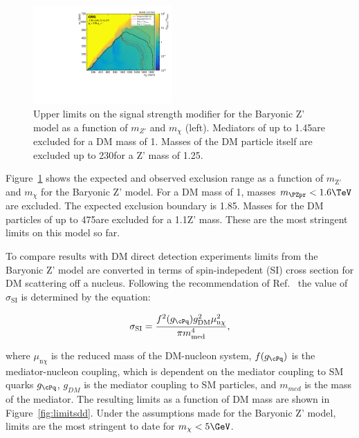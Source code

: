 \begin{figure}[htbp]
  \centering
  \includegraphics[width=0.475\textwidth]{figures/limits/limit2d_zpb_monohbb_.pdf}
  \caption{Upper limits on the signal strength modifier for the Baryonic Z' model  as a function of $m_{Z'}$ and $m_\chi$ (left). Mediators of up to 1.45\TeV are excluded for a DM mass of 1\GeV. Masses of the DM particle itself are excluded up to 230\GeV for a Z' mass of 1.25\TeV.}
  \label{fig:limits}
\end{figure}




Figure~\ref{fig:limits} shows the expected and observed exclusion range as a function of $m_{\text{Z}'}$ and $m_{\chi}$ for the Baryonic Z' model. For a DM mass of 1\GeV, masses $\mzp<1.6\TeV$ are excluded. The expected exclusion boundary is 1.85\TeV. Masses for the DM particles of up to 475\GeV are excluded for a 1.1\TeV Z' mass. These are the most stringent limits on this model so far. %

To compare results with DM direct detection experiments limits from the Baryonic Z' model are converted in terms of spin-indepedent (SI) cross section \SigSI for DM scattering off a nucleus.
Following the recommendation of Ref.~\cite{presentDM} the value of $\sigma_\text{SI}$ is determined by the equation:

\begin{equation}
\sigma_\text{SI} = \frac{f^2(g_{\cPq})g^2_{\mathrm{DM}}\mu^2_{\mathrm{n}\chi}}{\pi m^4_{\mathrm{med}}},
\end{equation}

where $\mu_{\mathrm{n}\chi}$ is the reduced mass of the DM-nucleon system, $f(g_{\cPq})$ is the mediator-nucleon coupling, which is dependent on the mediator coupling to SM quarks $g_{\cPq}$, $g_{DM}$ is the mediator coupling to SM particles, and $m_{med}$ is the mass of the mediator.
The resulting \SigSI limits as a function of DM mass are shown in Figure~\ref{fig:limitsdd}.
Under the assumptions made for the Baryonic Z' model, limits are the most stringent to date for $m_\chi < 5\GeV$.


